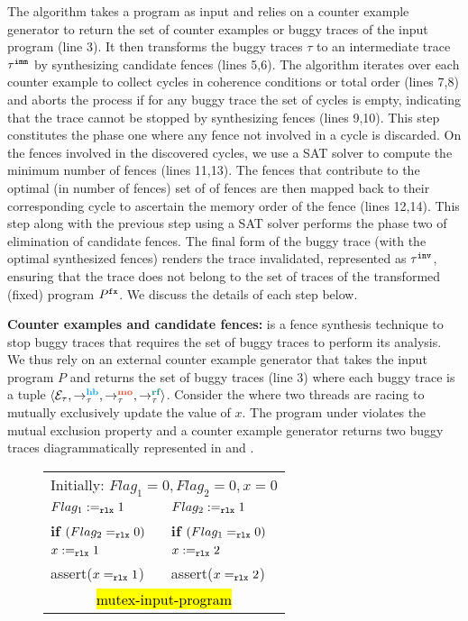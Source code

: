 The algorithm takes a \cc program as input and relies on a 
counter example generator to return the set of counter 
examples or buggy traces of the input program (line 3).
It then transforms the buggy traces $\tau$ to an intermediate 
trace ${\tau}^{\mathtt{imm}}$ by synthesizing candidate 
fences (lines 5,6).
%
The algorithm iterates over each counter example to 
collect cycles in coherence conditions or \sc total order
(lines 7,8) and aborts the process if for any buggy trace
the set of cycles is empty, indicating that the trace cannot 
be stopped by synthesizing \cc fences (lines 9,10).
This step constitutes the phase one where any fence not
involved in a cycle is discarded.
%
On the fences involved in the discovered cycles, we use a
SAT solver to compute the minimum number of fences
(lines 11,13). 
%
The fences that contribute to the optimal (in number of
fences) set of of fences are then mapped back to their 
corresponding cycle to ascertain the memory order of 
the fence (lines 12,14).
%
This step along with the previous step using a SAT solver
performs the phase two of elimination of candidate fences.
%
The final form of the buggy trace (with the optimal 
synthesized fences) renders the trace invalidated,
represented as ${\tau}^{\mathtt{inv}}$, ensuring that the trace 
does not belong to the set of traces of the transformed
(fixed) program ${P}^{\mathtt{fx}}$. 
%
We discuss the details of each step below.

\noindent
{\bf Counter examples and candidate fences:}
\ourtechnique is a fence synthesis technique to stop
buggy traces that requires the set of buggy traces to 
perform its analysis. We thus rely on an external counter
example generator that takes the input program $P$ and
returns the set of buggy traces (line 3) where each buggy 
trace is a tuple $\langle \events_\tau, \setHB, \setMO, 
\setRF \rangle$.
%
Consider the  where two 
threads are racing to mutually exclusively update the
value of $x$. The program under \cc violates the 
mutual exclusion property and a counter example generator
returns two buggy traces diagrammatically represented in
 and .

\begin{figure}[!htb]
	\begin{center}
		\setlength{\tabcolsep}{5pt}
		\begin{tabular}{|l||l|}
			\hline
			\multicolumn{2}{|c|}{Initially: $Flag_1=0, Flag_2 = 0, x=0$} \\
			
			$ Flag_1 :=_\texttt{rlx} 1 $ & $ Flag_2 :=_\texttt{rlx} 1  $ \\
			\textbf{if} $ (Flag_2 =_\texttt{rlx} 0) $ & \textbf{if} $ (Flag_1 =_\texttt{rlx} 0) $ \\
			\quad $ x :=_\texttt{rlx} 1 $ & \quad $ x :=_\texttt{rlx} 2 $ \\
			\quad assert($ x =_\texttt{rlx} 1 $) & \quad assert($ x =_\texttt{rlx} 2 $) \\
			\hline
			
			\multicolumn{2}{c}{\hl{mutex-input-program}}
		\end{tabular} 
	\end{center}
\end{figure}

